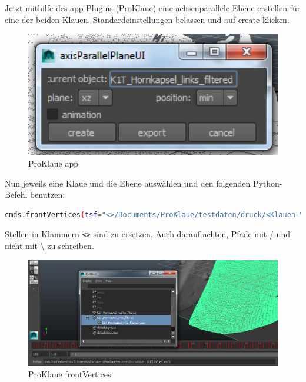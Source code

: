 \documentclass[a4paper, openany, oneside]{memoir}
\begin{document}
Jetzt mithilfe des app Plugins (ProKlaue) eine achsenparallele Ebene erstellen für eine der beiden Klauen. Standardeinstellungen belassen und auf create klicken.

\begin{figure}
\begin{center}
\includegraphics[height = 0.2\textheight, width=1\textwidth,keepaspectratio]{app.png}
\end{center}
\caption{ProKlaue app}
\label{img_app}
\end{figure}


Nun jeweils eine Klaue und die Ebene auswählen und den folgenden Python-Befehl benutzen:

\begin{minipage}[c]{\textwidth}
\begin{lstlisting}[language=bash]
cmds.frontVertices(tsf="<>/Documents/ProKlaue/testdaten/druck/<Klauen-Verzeichnis>/tsf_<left oder right>.csv")
\end{lstlisting}
\end{minipage}


Stellen in Klammern \texttt{<>} sind zu ersetzen. Auch darauf achten, Pfade mit / und nicht mit \textbackslash{} zu schreiben.

\begin{figure}
\begin{center}
\includegraphics[height = 0.35\textheight, width=1\textwidth,keepaspectratio]{frontVertices.png}
\end{center}
\caption{ProKlaue frontVertices}
\label{img_frontVertices}
\end{figure}
\end{document}
